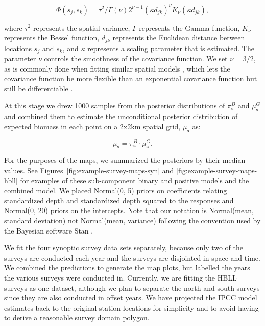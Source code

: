 \documentclass[11pt]{book}\usepackage[]{graphicx}\usepackage[]{color}
\begin{document}
\begin{equation}
  \Phi\left( s_j,s_k \right) = \tau^2/\Gamma(\nu)2^{\nu - 1}
    (\kappa d_{jk})^\nu K_\nu \left( \kappa d_{jk} \right),
\end{equation}

where $\tau^2$ represents the spatial variance, $\Gamma$ represents the Gamma
function, $K_\nu$ represents the Bessel function, $d_{jk}$ represents the
Euclidean distance between locations $s_j$ and $s_k$, and $\kappa$ represents a
scaling parameter that is estimated. The parameter $\nu$ controls the smoothness
of the covariance function. We set $\nu = 3/2$, as is commonly done when fitting
similar spatial models \citep[e.g.][]{ward2015, thorson2015, ono2016,
shelton2018}, which lets the covariance function be more flexible than an
exponential covariance function but still be differentiable
\citep{rasmussen2004}.

At this stage we drew 1000 samples from the posterior distributions of
$\pi_\mathbf{s}^B$ and $\mu_\mathbf{s}^G$ and combined them to estimate the unconditional posterior distribution of expected biomass in each point on a 2x2km spatial grid, $\mu_\mathbf{s}$ as:

\begin{equation}
  \mu_\mathbf{s} = \pi_\mathbf{s}^B \cdot \mu_\mathbf{s}^G.
\end{equation}

For the purposes of the maps, we summarized the posteriors by their median
values. See Figures~\ref{fig:example-survey-maps-syn} and
\ref{fig:example-survey-maps-hbll} for examples of these sub-component binary
and positive models and the combined model. We placed Normal(0, 5) priors on
coefficients relating standardized depth and standardized depth squared to the
responses and Normal(0, 20) priors on the intercepts. Note that our notation is
Normal(mean, standard deviation) not Normal(mean, variance) following the
convention used by the Bayesian software Stan \citep{rstan2018}.

We fit the four synoptic survey data sets separately, because only two of the
surveys are conducted each year and the surveys are disjointed in space and
time. We combined the predictions to generate the map plots, but labelled the
years the various surveys were conducted in. Currently, we are fitting the HBLL
surveys as one dataset, although we plan to separate the north and south surveys
since they are also conducted in offset years. We have projected the IPCC model
estimates back to the original station locations for simplicity and to avoid
having to derive a reasonable survey domain polygon.
\end{document}
